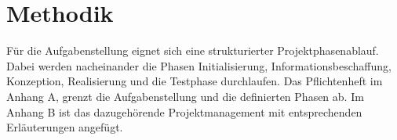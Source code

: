 \section{Methodik}
\label{sec:Methodik}
Für die Aufgabenstellung eignet sich eine strukturierter Projektphasenablauf. Dabei werden nacheinander die Phasen Initialisierung, Informationsbeschaffung, Konzeption, Realisierung und die Testphase durchlaufen. Das Pflichtenheft im Anhang A, grenzt die Aufgabenstellung und die definierten Phasen ab. Im Anhang B ist das dazugehörende Projektmanagement mit entsprechenden Erläuterungen angefügt. 

